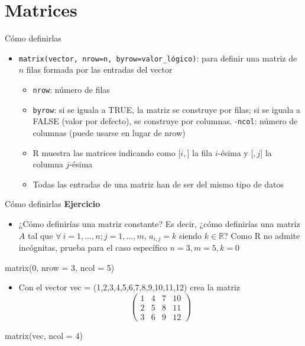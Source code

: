 \documentclass[
  ignorenonframetext,
  aspectratio=169]{beamer}
\providecommand{\tightlist}{%
  \setlength{\itemsep}{0pt}\setlength{\parskip}{0pt}}
\let\oldverbatim\verbatim
\let\endoldverbatim\endverbatim
\renewenvironment{verbatim}{\tiny\oldverbatim}{\endoldverbatim}
\begin{document}
\hypertarget{matrices}{%
\section{Matrices}\label{matrices}}

\begin{frame}[fragile]{Cómo definirlas}
\protect\hypertarget{cuxf3mo-definirlas}{}
\begin{itemize}
\tightlist
\item
  \texttt{matrix(vector,\ nrow=n,\ byrow=valor\_lógico)}: para definir
  una matriz de \(n\) filas formada por las entradas del vector

  \begin{itemize}
  \tightlist
  \item
    \texttt{nrow}: número de filas
  \item
    \texttt{byrow}: si se iguala a TRUE, la matriz se construye por
    filas; si se iguala a FALSE (valor por defecto), se construye por
    columnas. -\texttt{ncol}: número de columnas (puede usarse en lugar
    de nrow)
  \item
    R muestra las matrices indicando como {[}\(i,\){]} la fila
    \(i\)-ésima y {[}\(,j\){]} la columna \(j\)-ésima
  \item
    Todas las entradas de una matriz han de ser del mismo tipo de datos
  \end{itemize}
\end{itemize}
\end{frame}

\begin{frame}[fragile]{Cómo definirlas}
\protect\hypertarget{cuxf3mo-definirlas-1}{}
\textbf{Ejercicio}

\begin{itemize}
\tightlist
\item
  ¿Cómo definirías una matriz constante? Es decir, ¿cómo definirías una
  matriz \(A\) tal que \(\forall\  i=1,...,n; j = 1,...,m\),
  \(a_{i,j}=k\) siendo \(k\in\mathbb{R}\)? Como R no admite incógnitas,
  prueba para el caso específico \(n = 3, m = 5, k = 0\)
\end{itemize}

\begin{verbatim}
matrix(0, nrow = 3, ncol = 5)
\end{verbatim}

\begin{itemize}
\tightlist
\item
  Con el vector vec = (1,2,3,4,5,6,7,8,9,10,11,12) crea la matriz
  \[\begin{pmatrix}
  1 & 4 & 7 & 10\\
  2 & 5 & 8 & 11\\
  3 & 6 & 9 & 12
  \end{pmatrix}\]
\end{itemize}

\begin{verbatim}
matrix(vec, ncol = 4)
\end{verbatim}
\end{frame}
\end{document}
